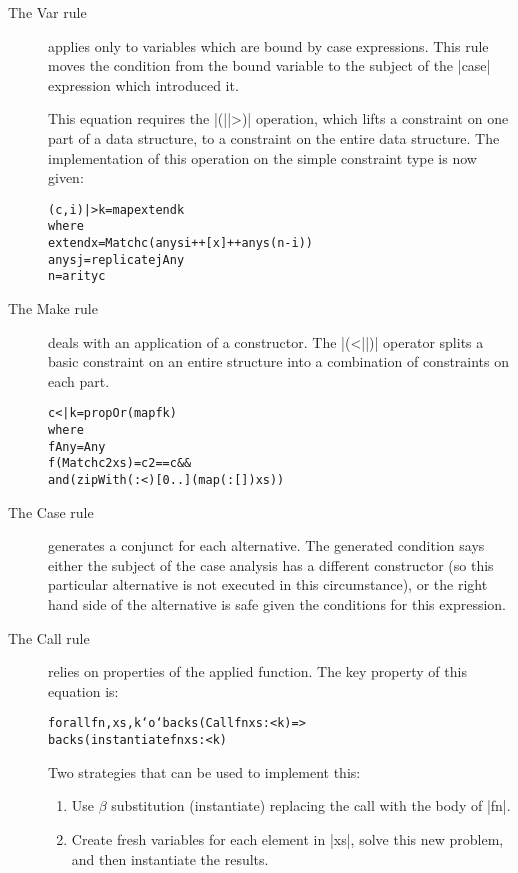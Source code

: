 \documentclass[preprint]{sigplanconf}
\newcommand{\C}[1]{\textsf{#1}}
\newenvironment{code}{\begin{alltt}\small}{\end{alltt}}
\begin{document}
\begin{description}

\item[The \C{Var} rule] applies only to variables which are bound by case expressions. This rule moves the condition from the bound variable to the subject of the |case| expression which introduced it.

    This equation requires the |(||>)| operation, which lifts a constraint on one part of a data structure, to a constraint on the entire data structure. The implementation of this operation on the simple constraint type is now given:

\begin{code}
(c,i) |> k = map extend k
    where
    extend x = Match c (anys i ++ [x] ++ anys (n-i))
    anys j = replicate j Any
    n = arity c
\end{code}

\item[The \C{Make} rule] deals with an application of a constructor. The |(<||)| operator splits a basic constraint on an entire structure into a combination of constraints on each part.

\begin{code}
c <| k = propOr (map f k)
    where
    f Any = Any
    f (Match c2 xs) = c2 == c &&
        and (zipWith (:<) [0..] (map (:[]) xs))
\end{code}

\item[The \C{Case} rule] generates a conjunct for each alternative. The generated condition says either the subject of the case analysis has a different constructor (so this particular alternative is not executed in this circumstance), or the right hand side of the alternative is safe given the conditions for this expression.

\item[The \C{Call} rule] relies on properties of the applied function. The key property of this equation is:

    \begin{code}
    forall fn, xs, k `o`  backs (Call fn xs :< k) =>
                          backs (instantiate fn xs :< k)
    \end{code}

    Two strategies that can be used to implement this:

    \begin{enumerate}
    \item Use $\beta$ substitution (\C{instantiate}) replacing the call with the body of |fn|.
    \item Create fresh variables for each element in |xs|, solve this new problem, and then instantiate the results.
    \end{enumerate}


\end{description}
\end{document}
